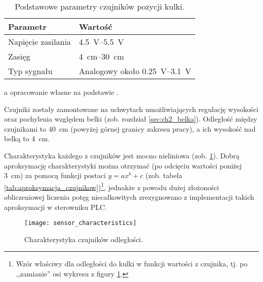 \begin{table}[h]
    \centering
    \begin{threeparttable}
        \caption{Podstawowe parametry czujników pozycji kulki.}
        \label{tab:parametry_czujnikow_Sharp}
        
        \begin{tabularx}{0.55\textwidth}{l | l}
            \toprule
            Parametr & Wartość \\
            \midrule
            Napięcie zasilania & \SIrange{4,5}{5,5}{\volt} \\
            Zasięg & \SIrange{4}{30}{\centi\meter} \\
            Typ sygnału & Analogowy około \SIrange{0,25}{3,1}{\volt} \\
            \bottomrule
        \end{tabularx}
        
        \begin{tablenotes}
            \footnotesize
            \item[a] opracowanie własne na podstawie \cite{SHARP_MANUAL}.
        \end{tablenotes}
    \end{threeparttable}
\end{table}

Czujniki zostały zamontowane na uchwytach umożliwiających regulację wysokości oraz pochylenia względem belki (zob. rozdział \ref{sec:ch2_belka}). Odległość między czujnikami to \SI{40}{\centi\meter} (powyżej górnej granicy zakresu pracy), a ich wysokość nad belką to \SI{4}{\centi\meter}.

Charakterystyka każdego z czujników jest mocno nieliniowa (zob. \cref{fig:charakterystyka_czujnikow}). Dobrą aproksymację charakterystyki można otrzymać (po odcięciu wartości poniżej \SI{3}{\centi\meter}) za pomocą funkcji postaci $y = a x ^ b + c$ (zob. tabela \ref{tab:aproksymacja_czujnikow})\footnote{Wzór właściwy dla odległości do kulki w funkcji wartości z czujnika, tj. po ,,zamianie'' osi wykresu z figury \ref{fig:charakterystyka_czujnikow}.}, jednakże z powodu dużej złożoności obliczeniowej liczenia potęg niecałkowitych zrezygnowano z implementacji takich aproksymacji w sterowniku PLC.

\begin{figure}[h]
    \centering
    \texttt{[image: sensor\_characteristics]}
    \caption{Charakterystyka czujników odległości.}
    \label{fig:charakterystyka_czujnikow}
\end{figure}

